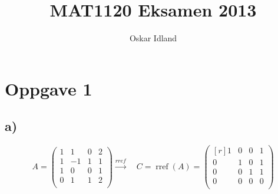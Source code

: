 \documentclass{article}
\author{Oskar Idland}
\title{MAT1120 Eksamen 2013}
\date{}
\begin{document}
\maketitle
\newpage

\section*{Oppgave 1}
\subsection*{a)}

\[
A = 
\begin{pmatrix}
 1 & 1 & 0 & 2 \\
 1 & -1 & 1 & 1 \\
 1 & 0 & 0 & 1 \\
 0 & 1 & 1 & 2 \\
\end{pmatrix} \xrightarrow{rref}

\quad

C  =  \operatorname{rref}(A) =
\begin{pmatrix*}[r]
 1 & 0 & 0 & 1 \\
 0 & 1 & 0 & 1 \\
 0 & 0 & 1 & 1 \\
 0 & 0 & 0 & 0 \\
\end{pmatrix*}
\]
\end{document}
